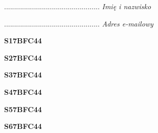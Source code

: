 \begin{turn}{90}\begin{minipage}{\linewidth} \vspace{20mm} ................................................  \textit{Imię i nazwisko}\end{minipage}\end{turn}

\begin{turn}{90}\begin{minipage}{\linewidth} \vspace{20mm} ................................................  \textit{Adres e-mailowy}\end{minipage}\end{turn}

\begin{turn}{90}\huge \begin{minipage}{\linewidth} \vspace{10mm}\textbf{S17BFC44}\end{minipage}\end{turn}

\begin{turn}{90}\huge \begin{minipage}{\linewidth} \vspace{10mm}\textbf{S27BFC44}\end{minipage}\end{turn}

\begin{turn}{90}\huge \begin{minipage}{\linewidth} \vspace{10mm}\textbf{S37BFC44}\end{minipage}\end{turn}

\begin{turn}{90}\huge \begin{minipage}{\linewidth} \vspace{10mm}\textbf{S47BFC44}\end{minipage}\end{turn}

\begin{turn}{90}\huge \begin{minipage}{\linewidth} \vspace{10mm}\textbf{S57BFC44}\end{minipage}\end{turn}

\begin{turn}{90}\huge \begin{minipage}{\linewidth} \vspace{10mm}\textbf{S67BFC44}\end{minipage}\end{turn}

